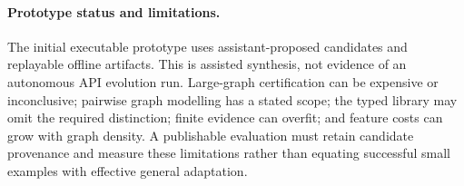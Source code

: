 \paragraph{Prototype status and limitations.}
The initial executable prototype uses assistant-proposed candidates and
replayable offline artifacts. This is assisted synthesis, not evidence of
an autonomous API evolution run. Large-graph certification can be expensive
or inconclusive; pairwise graph modelling has a stated scope; the typed
library may omit the required distinction; finite evidence can overfit;
and feature costs can grow with graph density. A publishable evaluation
must retain candidate provenance and measure these limitations rather than
equating successful small examples with effective general adaptation.
